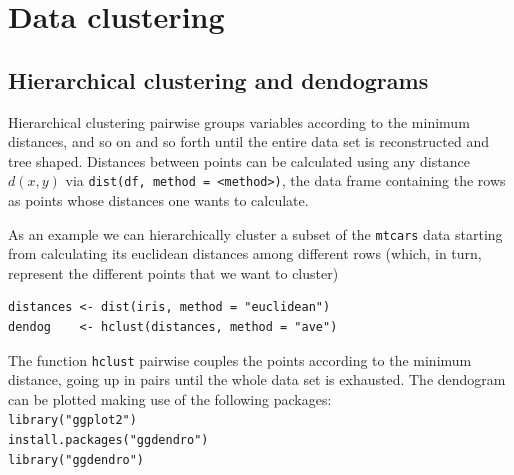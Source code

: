 \chapter{Data clustering}\label{sec: clusters}

\section*{Hierarchical clustering and dendograms}
Hierarchical clustering pairwise groups 
variables according to the minimum distances,
and so on and so forth until the entire data 
set is reconstructed and tree shaped. Distances
between points can be calculated using any
distance $d(x,y)$ via
\texttt{dist(df, method = <method>)}, the data frame
containing the rows as points whose distances one
wants to calculate. 
\medskip 

As an example we can hierarchically cluster a subset
of the \texttt{mtcars} data starting from calculating 
its euclidean distances among different rows (which, 
in turn, represent the different points that we want
to cluster)
\begin{verbatim}
distances <- dist(iris, method = "euclidean")
dendog    <- hclust(distances, method = "ave") 
\end{verbatim}
The function \texttt{hclust} pairwise couples the points
according to the minimum distance, going up in pairs until
the whole data set is exhausted.
\bigskip
The dendogram can be plotted making use of the 
following packages:\\
\texttt{library("ggplot2")}\\
\texttt{install.packages("ggdendro")}\\
\texttt{library("ggdendro")}
\bigskip 

